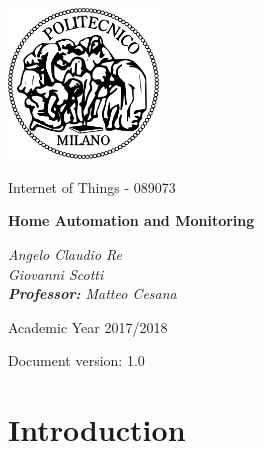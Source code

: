 \documentclass[a4paper,12pt]{report}
\begin{document}
\begin{titlepage}
\centering
\includegraphics[width=0.30\textwidth]{./pictures/logo_poli}\par
	\vspace{1.8cm}
	{\Large {Internet of Things - 089073} \par}
	\vspace{1.2cm}
	{\LARGE \textbf{Home Automation and Monitoring} \par}
	\vspace{2.5cm}
	\begin{flushright}
		{\Large\itshape{Angelo Claudio Re \\ Giovanni Scotti \\}
		\vspace{0.5cm} 
		\Large{\textbf{Professor:} Matteo Cesana}
	    \par}
	\end{flushright}
	\vspace{2cm}
	\vfill
	{\large Academic Year 2017/2018 \par}
	\vspace{0.3cm}
	{\large Document version: 1.0\par}
\end{titlepage}

\tableofcontents

\chapter{Introduction}
\label{ch:Introduction}
%

%

%

\end{document}
